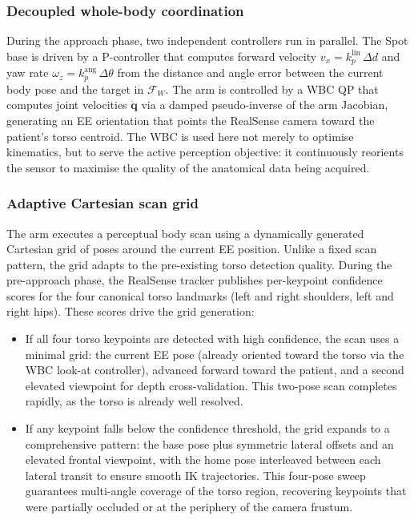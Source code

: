 \subsubsection{Decoupled whole-body coordination}

During the approach phase, two independent controllers run in parallel. The
Spot base is driven by a P-controller that computes forward velocity
$v_x = k_p^{\mathrm{lin}}\,\Delta d$ and yaw rate
$\omega_z = k_p^{\mathrm{ang}}\,\Delta\theta$ from the distance and angle
error between the current body pose and the target in $\mathcal{F}_W$. The
arm is controlled by a \ac{WBC} \ac{QP} that computes joint velocities
$\dot{\mathbf{q}}$ via a damped pseudo-inverse of the arm Jacobian,
generating an EE orientation that points the RealSense camera toward the
patient's torso centroid. The \ac{WBC} is used here not merely to optimise
kinematics, but to serve the active perception objective: it continuously
reorients the sensor to maximise the quality of the anatomical data being
acquired.

\subsubsection{Adaptive Cartesian scan grid}

The arm executes a perceptual body scan using a dynamically generated
Cartesian grid of poses around the current \ac{EE} position. Unlike a fixed
scan pattern, the grid adapts to the pre-existing torso detection quality.
During the pre-approach phase, the RealSense tracker publishes per-keypoint
confidence scores for the four canonical torso landmarks (left and right
shoulders, left and right hips). These scores drive the grid generation:

\begin{itemize}
  \item If all four torso keypoints are detected with high confidence, the
        scan uses a minimal grid: the current \ac{EE} pose (already
        oriented toward the torso via the \ac{WBC} look-at controller),
        advanced forward toward the patient, and a second elevated
        viewpoint for depth cross-validation. This two-pose scan completes
        rapidly, as the torso is already well resolved.
  \item If any keypoint falls below the confidence threshold, the grid
        expands to a comprehensive pattern: the base pose plus symmetric
        lateral offsets and an elevated frontal viewpoint, with the home
        pose interleaved between each lateral transit to ensure smooth
        \ac{IK} trajectories. This four-pose sweep guarantees multi-angle
        coverage of the torso region, recovering keypoints that were
        partially occluded or at the periphery of the camera frustum.
\end{itemize}

